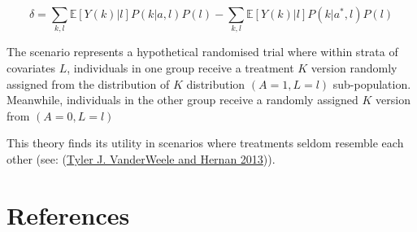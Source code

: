 \documentclass[
  singlecolumn]{report}
\begin{document}
\[ \delta = \sum_{k,l} \mathbb{E}[Y(k)|l] P(k|a,l) P(l) - \sum_{k,l} \mathbb{E}[Y(k)|l] P(k|a^*,l) P(l)\]

The scenario represents a hypothetical randomised trial where within
strata of covariates \(L\), individuals in one group receive a treatment
\(K\) version randomly assigned from the distribution of \(K\)
distribution \((A = 1, L = l)\) sub-population. Meanwhile, individuals
in the other group receive a randomly assigned \(K\) version from
\((A = 0, L = l)\)

This theory finds its utility in scenarios where treatments seldom
resemble each other (see: (\protect\hyperlink{ref-vanderweele2013}{Tyler
J. VanderWeele and Hernan 2013})).

\hypertarget{references}{%
\section*{References}\label{references}}
\end{document}
